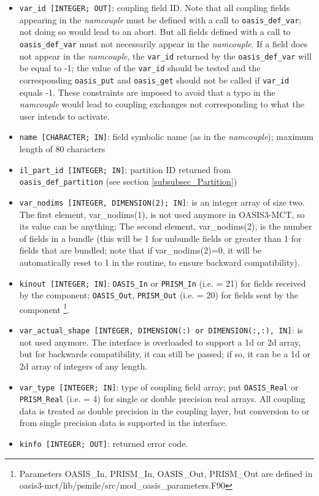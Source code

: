 \begin{itemize}
  \begin{itemize}
  \item {\tt var\_id [INTEGER; OUT]}: coupling field ID.  Note that all 
      coupling fields appearing in the {\it namcouple} must be defined with 
      a call to {\tt oasis\_def\_var}; not doing so would lead to an abort.  
      But all fields defined with a call to {\tt oasis\_def\_var} must not necessarily 
      appear in the {\it namcouple}. If a field does not appear in the {\it namcouple}, 
      the {\tt var\_id} returned by the {\tt oasis\_def\_var} will be equal to -1; 
      the value of the {\tt var\_id} should be tested and the corresponding 
      {\tt oasis\_put} and {\tt oasis\_get} should not be called if {\tt var\_id} 
      equals -1. These constraints are imposed to avoid that a typo in the {\it namcouple}
       would lead to coupling exchanges not corresponding to what the user intends to activate. 
  \item {\tt name [CHARACTER; IN]}: field symbolic name (as in the
    {\it namcouple}); maximum length of 80 characters
  \item {\tt il\_part\_id [INTEGER; IN]}: partition ID returned from {\tt oasis\_def\_partition} (see section
    \ref{subsubsec_Partition})
  \item {\tt var\_nodims [INTEGER, DIMENSION(2); IN]}: is an integer array of size two.  
    The first element, var\_nodims(1), is not used anymore in OASIS3-MCT, so 
    its value can be anything; The second element, var\_nodims(2),
    is the number of fields in a bundle (this will be 1 for unbundle
    fields or greater than 1 for fields that are bundled; note that
    if var\_nodims(2)=0, it will be automatically reset to 1 in the
    routine, to ensure backward compatibility).
  \item {\tt kinout [INTEGER; IN]}: {\tt OASIS\_In} or {\tt PRISM\_In}
    (i.e. = 21) for fields received by the component; {\tt OASIS\_Out},
    {\tt PRISM\_Out} (i.e. = 20) for fields sent by the component
    \footnote{Parameters OASIS\_In, PRISM\_In, OASIS\_Out, PRISM\_Out
      are defined in
      oasis3-mct/lib/psmile/src/mod\_oasis\_parameters.F90}.
  \item {\tt var\_actual\_shape [INTEGER, DIMENSION(:) or DIMENSION(:,:), IN]}:
    is not used anymore.  The interface is overloaded to support a 
    1d or 2d array, but for
    backwards compatibility, it can still be passed; if so, it can be 
    a 1d or 2d array of integers of any length.
  \item {\tt var\_type [INTEGER; IN]}: type of coupling field array;
    put {\tt OASIS\_Real} or {\tt PRISM\_Real} (i.e. = 4) for single
    or double precision real arrays.  All coupling data is treated as
    double precision in the coupling layer, but conversion to or from
    single precision data is supported in the interface.
  \item {\tt kinfo [INTEGER; OUT]}: returned error code.
  \end{itemize}
\end{itemize}

